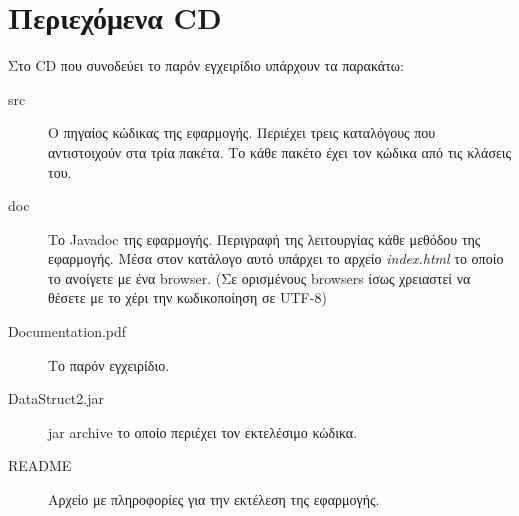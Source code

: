 \documentclass[a4paper]{article}
\begin{document}
\section{Περιεχόμενα CD}
Στο CD που συνοδεύει το παρόν εγχειρίδιο υπάρχουν τα παρακάτω:
\begin{description}
\item[src] Ο πηγαίος κώδικας της εφαρμογής. Περιέχει τρεις καταλόγους που
αντιστοιχούν στα τρία πακέτα. Το κάθε πακέτο έχει τον κώδικα από τις κλάσεις
του.
\item[doc] Το Javadoc της εφαρμογής. Περιγραφή της λειτουργίας κάθε μεθόδου της
εφαρμογής. Μέσα στον κατάλογο αυτό υπάρχει το αρχείο \emph{index.html} το οποίο
το ανοίγετε με ένα browser. (Σε ορισμένους browsers ίσως χρειαστεί να θέσετε με
το χέρι την κωδικοποίηση σε UTF-8)
\item[Documentation.pdf] Το παρόν εγχειρίδιο.
\item[DataStruct2.jar] jar archive το οποίο περιέχει τον εκτελέσιμο κώδικα.
\item[README] Αρχείο με πληροφορίες για την εκτέλεση της εφαρμογής.
\end{description}
\end{document}
